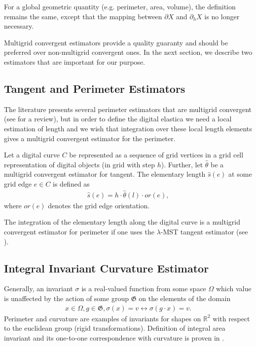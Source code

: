 \documentclass[runningheads]{llncs}
\begin{document}
For a global geometric quantity (e.g. perimeter, area, volume), the definition remains the same, except that the mapping
between $\partial X$ and $\partial_h X$ is no longer necessary.
	
Multigrid convergent estimators provide a quality guaranty and should be preferred over non-multigrid convergent
ones. In the next section, we describe two estimators that are important for our purpose.

\subsection{Tangent and Perimeter Estimators}

The literature presents several perimeter estimators that are multigrid convergent (see
\cite{coeurjolly04comparative,coeurjolly12multigrid} for a review), but in order to define the digital elastica we need a local estimation
of length and we wish that integration over these local length elements gives a multigrid convergent estimator for the
perimeter.

\begin{definition}
  Let a digital curve $C$ be represented as a sequence of grid vertices in a grid cell representation of digital objects (in grid with step $h$). Further, let $\hat{\theta}$ be a multigrid convergent estimator for tangent. The elementary length $\hat{s}(e)$ at some grid edge $e\in C$ is defined as
  \begin{align*}
    \hat{s}(e) = h \cdot \hat{\theta}(l) \cdot or(e),
  \end{align*}
  where $or(e)$ denotes the grid edge orientation.
\end{definition}
The integration of the elementary length along the digital curve is a multigrid convergent estimator for perimeter if
one uses the $\lambda$-MST \cite{lachaud07tangent} tangent estimator (see \cite{lachaud06hdr}).

\subsection{Integral Invariant Curvature Estimator}
Generally, an invariant $\sigma$ is a real-valued function from some space $\Omega$ which value is unaffected by the action
of some group $\mathfrak{G}$ on the elements of the domain
\begin{align*}
  x \in \Omega, g \in \mathfrak{G}, \sigma(x) = v \longleftrightarrow \sigma(g \cdot x ) = v.
\end{align*}
Perimeter and curvature are examples of invariants for shapes on $\mathbb{R}^2$ with respect to the euclidean group
(rigid transformations). Definition of integral area invariant and its one-to-one correspondence with curvature is
proven in \cite{manay04intinvariant}.
\end{document}
